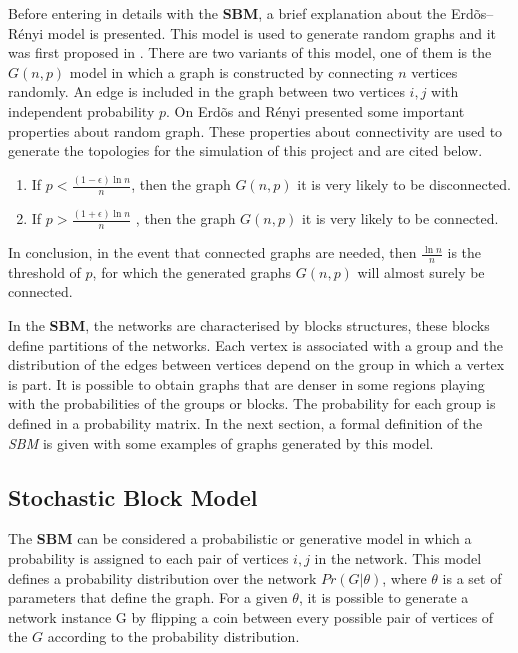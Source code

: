 Before entering in details with the \textbf{SBM}, a brief explanation about the Erd\~os--R\'enyi model is presented. This model is used to generate random graphs and it was first proposed in \cite{erdds1959random}. There are two variants of this model, one of them is the $G(n, p)$ model in which a graph is constructed by connecting $n$ vertices randomly. An edge is included in the graph between two vertices $i,j$ with independent probability $p$. On \cite{erdos1960evolution} Erd\~os and R\'enyi presented some important properties about random graph. These properties about connectivity are used to generate the topologies for the simulation of this project and are cited below.


\begin{enumerate}
\item If $p<{\tfrac {(1-\epsilon )\ln n}{n}}$, then the graph $G(n, p)$ it is very likely to be disconnected.
\item If $p>{\tfrac {(1+\epsilon )\ln n}{n}}$ , then the graph $G(n, p)$ it is very likely to be connected.
\end{enumerate}

In conclusion, in the event that connected graphs are needed, then ${\tfrac {\ln n}{n}}$ is the threshold of $p$, for which the generated graphs $G(n, p)$ will almost surely be connected.  

In the \textbf{SBM}, the networks are characterised by blocks structures, these blocks define partitions of the networks. Each vertex is associated with a group and the distribution of the edges between vertices depend on the group in which a vertex is part. It is possible to obtain graphs that are denser in some regions playing with the probabilities of the groups or blocks. The probability for each group is defined in a probability matrix. In the next section, a formal definition of the \textit{SBM} is given with some examples of graphs generated by this model.


\subsection{Stochastic Block Model}

The \textbf{SBM} can be considered a probabilistic or generative model in which a probability is assigned to each pair of vertices $i,j$ in the network. This model defines a probability distribution over the network $Pr(G | \theta)$, where $\theta$ is a set of parameters that define the graph. For a given $\theta$, it is possible to generate a network instance G by flipping a coin between every possible pair of vertices of the $G$ according to the probability distribution.  

